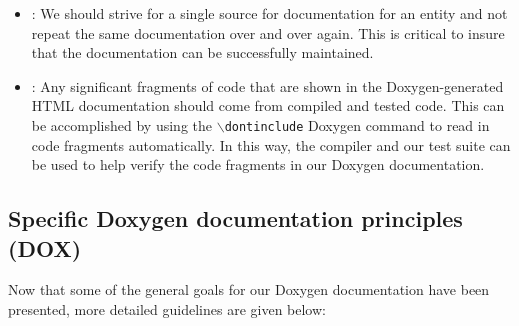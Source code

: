 \begin{itemize}
{}\item\DOXPDoNotRepeat: We should strive for a single source for
documentation for an entity and not repeat the same documentation over and
over again.  This is critical to insure that the documentation can be
successfully maintained.

{}\item\DOXPDocumentationMaintainItself: Any significant fragments of code
that are shown in the Doxygen-generated HTML documentation should come from
compiled and tested code.  This can be accomplished by using the
{}\texttt{$\backslash$dontinclude} Doxygen command to read in code fragments
automatically.  In this way, the compiler and our test suite can be used to
help verify the code fragments in our Doxygen documentation.

\end{itemize}

%
\subsection{Specific Doxygen documentation principles (DOX)}
%

Now that some of the general goals for our Doxygen documentation have
been presented, more detailed guidelines are given below:

